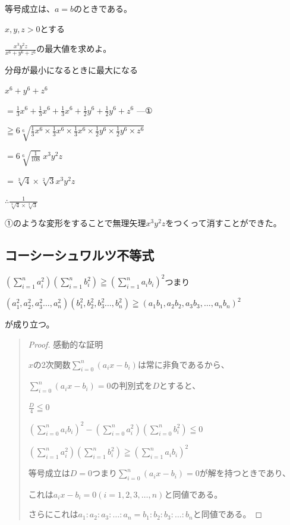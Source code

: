 \documentclass[uplatex,dvipdfmx]{jsbook}
\begin{document}
等号成立は、$a=b$のときである。

\begin{problem}[練習問題]
    $x,y,z>0$とする

    $\displaystyle \frac{x^3y^2z}{x^6+y^6+z^6}$の最大値を求めよ。
\end{problem}

\begin{answer}
        分母が最小になるときに最大になる

        $x^6+y^6+z^6$

        $\displaystyle=\frac{1}{3}x^6+\frac{1}{3}x^6+\frac{1}{3}x^6+\frac{1}{2}y^6+\frac{1}{2}y^6+z^6\text{ ---①}$

        $\displaystyle\geqq6\sqrt[6]{\frac{1}{3}x^6\times\frac{1}{3}x^6\times\frac{1}{3}x^6\times\frac{1}{2}y^6\times\frac{1}{2}y^6\times z^6}$

        $\displaystyle=6\sqrt[6]{\frac{1}{108}}\ x^3y^2z$

        $\displaystyle=\sqrt[3]{4}\times\sqrt[2]{3}x^3y^2z$

        $\displaystyle\therefore \frac{1}{\sqrt[3]{4}\times\sqrt[2]{3}}$

        ①のような変形をすることで無理矢理$x^3y^2z$をつくって消すことができた。
\end{answer}

\subsection{コーシーシュワルツ不等式}
$\displaystyle \left(\sum_{i=1}^n a^2_i\right)\left(\sum_{i=1}^n b^2_i\right)\geqq\left(\sum_{i=1}^n a_ib_i\right)^2$つまり

$\left(a^2_1,a^2_2,a^2_3\dots,a^2_n\right)\left(b^2_1,b^2_2,b^2_3\dots,b^2_n\right)\geqq\left(a_1b_1,a_2b_2,a_3b_3,\dots,a_nb_n\right)^2$

が成り立つ。
\begin{quote}
    \begin{proof}
        感動的な証明

        $x$の2次関数$\displaystyle \sum_{i=0}^{n}(a_ix-b_i)$は常に非負であるから、

        $\displaystyle \sum_{i=0}^{n}(a_ix-b_i)=0$の判別式を$D$とすると、

        $\displaystyle\frac{D}{4}\leqq 0$

        $\displaystyle \left(\sum_{i=0}^{n}a_ib_i\right)^2-\left(\sum_{i=0}^{n}a_i^2\right)\left(\sum_{i=0}^{n}b_i^2\right)\leqq 0$

        $\displaystyle \left(\sum_{i=1}^n a^2_i\right)\left(\sum_{i=1}^n b^2_i\right)\geqq\left(\sum_{i=1}^n a_ib_i\right)^2$

        等号成立は$D=0$つまり$\displaystyle \sum_{i=0}^{n}(a_ix-b_i)=0$が解を持つときであり、

        これは$a_ix-b_i=0 \left(i = 1,2,3,\dots ,n\right)$と同値である。

        さらにこれは$a_1:a_2:a_3:\dots:a_n=b_1:b_2:b_3:\dots:b_n$と同値である。
    \end{proof}
\end{quote}
\end{document}
